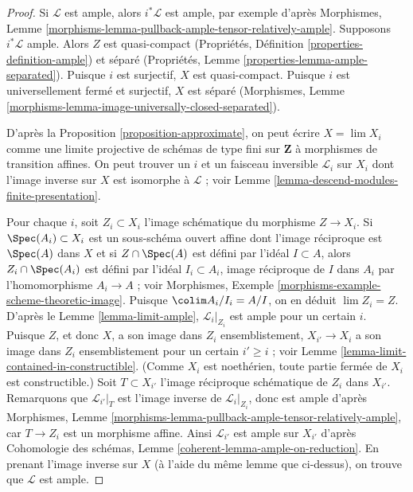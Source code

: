 \begin{proof}
Si $\mathcal{L}$ est ample, alors $i^*\mathcal{L}$ est ample, par
exemple d'après Morphismes, Lemme
\ref{morphisms-lemma-pullback-ample-tensor-relatively-ample}.
Supposons $i^*\mathcal{L}$ ample. Alors $Z$ est quasi-compact
(Propriétés, Définition \ref{properties-definition-ample})
et séparé
(Propriétés, Lemme \ref{properties-lemma-ample-separated}).
Puisque $i$ est surjectif, $X$ est quasi-compact.
Puisque $i$ est universellement fermé et surjectif,
$X$ est séparé (Morphismes, Lemme
\ref{morphisms-lemma-image-universally-closed-separated}).

\medskip\noindent
D'après la Proposition \ref{proposition-approximate}, on peut écrire
$X = \lim X_i$ comme une limite projective de schémas de type fini sur $\mathbf{Z}$
à morphismes de transition affines. On peut trouver un $i$ et un faisceau
inversible $\mathcal{L}_i$ sur $X_i$ dont l'image inverse sur $X$ est isomorphe à
$\mathcal{L}$ ; voir Lemme \ref{lemma-descend-modules-finite-presentation}.

\medskip\noindent
Pour chaque $i$, soit $Z_i \subset X_i$ l'image schématique
du morphisme $Z \to X_i$. Si $\Spec(A_i) \subset X_i$ est un sous-schéma ouvert
affine dont l'image réciproque est $\Spec(A)$ dans $X$ et si
$Z \cap \Spec(A)$ est défini par l'idéal $I \subset A$,
alors $Z_i \cap \Spec(A_i)$ est défini par l'idéal $I_i \subset A_i$,
image réciproque de $I$ dans $A_i$ par l'homomorphisme
$A_i \to A$ ; voir
Morphismes, Exemple \ref{morphisms-example-scheme-theoretic-image}.
Puisque $\colim A_i/I_i = A/I$, on en déduit $\lim Z_i = Z$.
D'après le Lemme \ref{lemma-limit-ample}, $\mathcal{L}_i|_{Z_i}$
est ample pour un certain $i$. Puisque $Z$, et donc $X$, a son image dans $Z_i$
ensemblistement, $X_{i'} \to X_i$ a son image dans $Z_i$
ensemblistement pour un certain $i' \geq i$ ; voir
Lemme \ref{lemma-limit-contained-in-constructible}.
(Comme $X_i$ est noethérien, toute partie fermée
de $X_i$ est constructible.) Soit $T \subset X_{i'}$
l'image réciproque schématique de $Z_i$ dans $X_{i'}$.
Remarquons que $\mathcal{L}_{i'}|_T$ est l'image inverse
de $\mathcal{L}_i|_{Z_i}$, donc est ample d'après
Morphismes, Lemme \ref{morphisms-lemma-pullback-ample-tensor-relatively-ample},
car $T \to Z_i$ est un morphisme affine.
Ainsi $\mathcal{L}_{i'}$ est ample sur $X_{i'}$
d'après Cohomologie des schémas, Lemme \ref{coherent-lemma-ample-on-reduction}.
En prenant l'image inverse sur $X$ (à l'aide du même lemme que ci-dessus),
on trouve que $\mathcal{L}$ est ample.
\end{proof}


